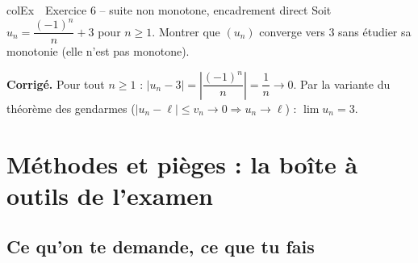 \documentclass[11pt,a4paper]{article}
\newenvironment{exemple}[1][Exemple]
  {\begin{fiche}{colEx}{\ding{217}~~#1}}{\end{fiche}}
\begin{document}
\begin{exemple}[Exercice 6 -- suite non monotone, encadrement direct]
Soit $u_n = \dfrac{(-1)^n}{n} + 3$ pour $n \geq 1$. Montrer que $(u_n)$ converge vers $3$ sans étudier sa monotonie (elle n'est pas monotone).

\smallskip
\textbf{Corrigé.} Pour tout $n \geq 1$ : $|u_n - 3| = \left|\dfrac{(-1)^n}{n}\right| = \dfrac{1}{n} \to 0$. Par la variante du théorème des gendarmes ($|u_n - \ell| \leq v_n \to 0 \Rightarrow u_n \to \ell$) : $\lim u_n = 3$.
\end{exemple}

\section{Méthodes et pièges : la boîte à outils de l'examen}

\subsection{Ce qu'on te demande, ce que tu fais}
\end{document}
